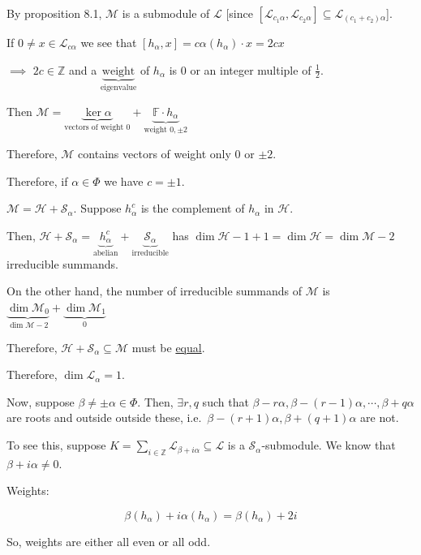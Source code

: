 \documentclass{article}
\theoremstyle{definition}
\begin{document}
By proposition 8.1, \(\mathcal{M}\) is a submodule of \(\mathcal{L}\) [since \([\mathcal{L}_{c_1 \alpha}, \mathcal{L}_{c_2 \alpha}] \subseteq \mathcal{L}_{(c_1 + c_2)\alpha}\)].

If \(0 \neq x \in \mathcal{L}_{c \alpha}\) we see that \([h_\alpha , x] = c \alpha (h_\alpha)\cdot x = 2 c x\) 

\(\implies\) \(2c\in \mathbb{Z}\) and a \(\underbrace{\text{weight}}_{\text{eigenvalue}}\) of \(h_\alpha\) is \(0\) or an integer multiple of \(\frac{1}{2}\).

Then \(\mathcal{M} = \underbrace{\ker \alpha}_{\text{vectors of weight } 0} + \underbrace{\mathbb{F} \cdot h_\alpha}_{\text{weight } 0, \pm 2}\) 

Therefore, \(\mathcal{M}\) contains vectors of weight only \(0\) or \(\pm 2\). 

Therefore, if \(\alpha \in \Phi\) we have \(c = \pm 1\).

\(\mathcal{M} = \mathcal{H} + \mathcal{S}_\alpha\). Suppose \(h_\alpha ^c \) is the complement of \(h_\alpha\) in \(\mathcal{H} \). 

Then, \(\mathcal{H} + \mathcal{S}_\alpha = \underbrace{h_\alpha^c}_{\text{abelian}} + \underbrace{\mathcal{S}_\alpha}_{\text{irreducible}}\) has \(\dim \mathcal{H} - 1 + 1 = \dim \mathcal{H} = \dim \mathcal{M} - 2\) irreducible summands.

On the other hand, the number of irreducible summands of \(\mathcal{M}\) is \(\underbrace{\dim \mathcal{M}_0}_{\dim \mathcal{M} - 2} + \underbrace{\dim \mathcal{M}_1}_{0}\) 

Therefore, \(\mathcal{H} + \mathcal{S}_\alpha \subseteq \mathcal{M}\) must be \underline{equal}.

Therefore, \(\dim \mathcal{L}_\alpha = 1\).

Now, suppose \(\beta \neq \pm \alpha \in \Phi\). Then, \(\exists r,q\) such that \(\beta - r \alpha , \beta - (r-1)\alpha , \cdots , \beta + q \alpha\) are roots and outside outside these, i.e.\ \(\beta - (r+1)\alpha , \beta + (q+1)\alpha\) are not.

To see this, suppose \(K = \sum_{i\in \mathbb{Z}}^{} \mathcal{L}_{\beta + i \alpha} \subseteq \mathcal{L}\) is a \(\mathcal{S}_\alpha\)-submodule. We know that \(\beta + i \alpha \neq 0\).

Weights:

\[
    \beta(h_\alpha) + i \alpha (h_\alpha) = \beta (h_\alpha) + 2i
\]  

So, weights are either all even or all odd.
\end{document}
